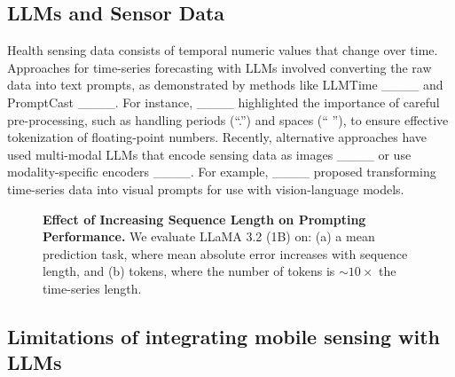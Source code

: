 \subsection{LLMs and Sensor Data}

Health sensing data consists of temporal numeric values that change over time. Approaches for time-series forecasting with LLMs involved converting the raw data into text prompts, as demonstrated by methods like LLMTime ____ and PromptCast ____. For instance, ____ highlighted the importance of careful pre-processing, such as handling periods (“.”) and spaces (“ ”), to ensure effective tokenization of floating-point numbers.  Recently, alternative approaches have used multi-modal LLMs that encode sensing data as images ____ or use modality-specific encoders ____. For example, ____ proposed transforming time-series data into visual prompts for use with vision-language models. 


\begin{figure}
    \centering
    \caption{\textbf{Effect of Increasing Sequence Length on Prompting Performance.} We evaluate LLaMA 3.2 (1B) on: (a) a mean prediction task, where mean absolute error increases with sequence length, and (b) tokens, where the number of tokens is $\sim 10\times$ the time-series length.} 
    \label{fig:limitations}
\end{figure}

\subsection{Limitations of integrating mobile sensing with LLMs} \label{sec:limitations}


